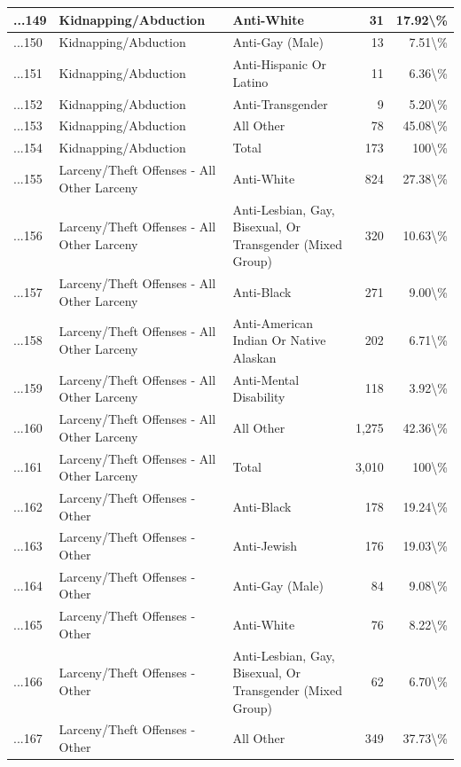 \documentclass[
]{krantz}
\begin{document}
\begin{longtable}[t]{l|l|l|r|r}
\hline
...149 & Kidnapping/Abduction & Anti-White & 31 & 17.92\textbackslash{}\%\\
\hline
...150 & Kidnapping/Abduction & Anti-Gay (Male) & 13 & 7.51\textbackslash{}\%\\
\hline
...151 & Kidnapping/Abduction & Anti-Hispanic Or Latino & 11 & 6.36\textbackslash{}\%\\
\hline
...152 & Kidnapping/Abduction & Anti-Transgender & 9 & 5.20\textbackslash{}\%\\
\hline
...153 & Kidnapping/Abduction & All Other & 78 & 45.08\textbackslash{}\%\\
\hline
...154 & Kidnapping/Abduction & Total & 173 & 100\textbackslash{}\%\\
\hline
...155 & Larceny/Theft Offenses - All Other Larceny & Anti-White & 824 & 27.38\textbackslash{}\%\\
\hline
...156 & Larceny/Theft Offenses - All Other Larceny & Anti-Lesbian, Gay, Bisexual, Or Transgender (Mixed Group) & 320 & 10.63\textbackslash{}\%\\
\hline
...157 & Larceny/Theft Offenses - All Other Larceny & Anti-Black & 271 & 9.00\textbackslash{}\%\\
\hline
...158 & Larceny/Theft Offenses - All Other Larceny & Anti-American Indian Or Native Alaskan & 202 & 6.71\textbackslash{}\%\\
\hline
...159 & Larceny/Theft Offenses - All Other Larceny & Anti-Mental Disability & 118 & 3.92\textbackslash{}\%\\
\hline
...160 & Larceny/Theft Offenses - All Other Larceny & All Other & 1,275 & 42.36\textbackslash{}\%\\
\hline
...161 & Larceny/Theft Offenses - All Other Larceny & Total & 3,010 & 100\textbackslash{}\%\\
\hline
...162 & Larceny/Theft Offenses - Other & Anti-Black & 178 & 19.24\textbackslash{}\%\\
\hline
...163 & Larceny/Theft Offenses - Other & Anti-Jewish & 176 & 19.03\textbackslash{}\%\\
\hline
...164 & Larceny/Theft Offenses - Other & Anti-Gay (Male) & 84 & 9.08\textbackslash{}\%\\
\hline
...165 & Larceny/Theft Offenses - Other & Anti-White & 76 & 8.22\textbackslash{}\%\\
\hline
...166 & Larceny/Theft Offenses - Other & Anti-Lesbian, Gay, Bisexual, Or Transgender (Mixed Group) & 62 & 6.70\textbackslash{}\%\\
\hline
...167 & Larceny/Theft Offenses - Other & All Other & 349 & 37.73\textbackslash{}\%\\

\end{longtable}
\end{document}
